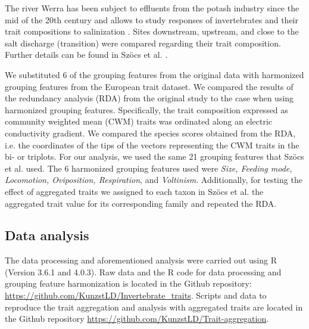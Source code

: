 \documentclass{article}
\begin{document}
The river Werra has been subject to effluents from the potash industry since the mid of the 20th century and allows to study responses of invertebrates and their trait compositions to salinization \cite{bathe_biological_2011}.
Sites downstream, upstream, and close to the salt discharge (transition) were compared regarding their trait composition. Further details can be found in Szöcs et al. \cite{szocs_effects_2014}. 

We substituted 6 of the grouping features from the original data with harmonized grouping features from the European trait dataset. We compared the results of the redundancy analysis (RDA) from the original study to the case when using harmonized grouping features. Specifically, the trait composition expressed as community weighted mean (CWM) traits was ordinated along an electric conductivity gradient. We compared the species scores obtained from the RDA, i.e. the coordinates of the tips of the vectors representing the CWM traits in the bi- or triplots. For our analysis, we used the same 21 grouping features that Szöcs et al. \cite{szocs_effects_2014} used. The 6 harmonized grouping features used were \textit{Size, Feeding mode, Locomotion, Oviposition, Respiration}, and \textit{Voltinism}. %
Additionally, for testing the effect of aggregated traits we assigned to each taxon in Szöcs et al. \cite{szocs_effects_2014} the aggregated trait value for its corresponding family and repeated the RDA.  


\subsection*{Data analysis}

The data processing and aforementioned analysis were carried out using R (Version 3.6.1 and 4.0.3). Raw data and the R code for data processing and grouping feature harmonization is located in the Github repository: \url{https://github.com/KunzstLD/Invertebrate_traits}. Scripts and data to reproduce the trait aggregation and analysis with aggregated traits are located in the Github repository \url{https://github.com/KunzstLD/Trait-aggregation}.
\end{document}
